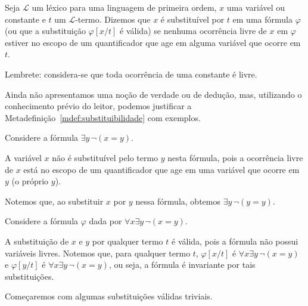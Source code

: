 \begin{metadefinition}\label{mdef:substituibilidade}
    Seja $\mathcal L$ um léxico para uma linguagem de primeira ordem, $x$ uma variável ou constante e $t$ um $\mathcal L$-termo.
    Dizemos que $x$ é substituível por $t$ em uma fórmula $\varphi$ (ou que a substituição $\varphi[x/t]$ é válida) se nenhuma ocorrência livre de $x$ em $\varphi$ estiver no escopo de um quantificador que age em alguma variável que ocorre em $t$.

    Lembrete: considera-se que toda ocorrência de uma constante é livre.
\end{metadefinition}

Ainda não apresentamos uma noção de verdade ou de dedução, mas, utilizando o conhecimento prévio do leitor, podemos justificar a Metadefinição~\ref{mdef:substituibilidade} com exemplos.

\begin{example}\label{exa:substituicaoInvalida}
    Considere a fórmula $\exists y \, \neg(x = y)$.

    A variável $x$ não é substituível pelo termo $y$ nesta fórmula, pois a ocorrência livre de $x$ está no escopo de um quantificador que age em uma variável que ocorre em $y$ (o próprio $y$).

    Notemos que, ao substituir $x$ por $y$ nessa fórmula, obtemos $\exists y \, \neg(y = y)$.
\end{example}

\begin{example}\label{exa:substituicaoSemVariaveisLivres}
    Considere a fórmula $\varphi$ dada por $\forall x \exists y \, \neg(x = y)$.

    A substituição de $x$ e $y$ por qualquer termo $t$ é válida, pois a fórmula não possui variáveis livres.
    Notemos que, para qualquer termo $t$, $\varphi[x/t]$ é $\forall x \exists y \, \neg(x = y)$ e $\varphi[y/t]$ é $\forall x \exists y \, \neg(x = y)$, ou seja, a fórmula é invariante por tais substituições.
\end{example}

Começaremos com algumas substituições válidas triviais.

